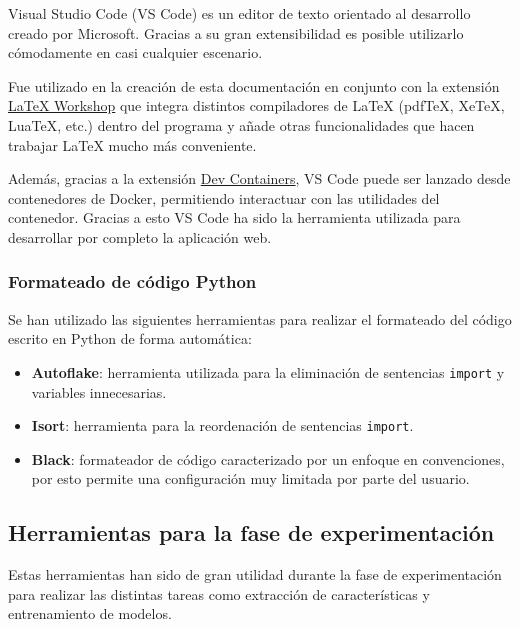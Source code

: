 Visual Studio Code (VS Code) es un editor de texto orientado al desarrollo
creado por Microsoft. Gracias a su gran extensibilidad es posible utilizarlo
cómodamente en casi cualquier escenario.

Fue utilizado en la creación de esta documentación en conjunto con la extensión
\href{https://github.com/James-Yu/LaTeX-Workshop}{\LaTeX{} Workshop} que integra
distintos compiladores de \LaTeX{} (pdfTeX, XeTeX, LuaTeX, etc.) dentro del
programa y añade otras funcionalidades que hacen trabajar \LaTeX{} mucho más
conveniente.

Además, gracias a la extensión
\href{https://marketplace.visualstudio.com/items?itemName=ms-vscode-remote.remote-containers}{Dev
Containers}, VS Code puede ser lanzado desde contenedores de Docker, permitiendo
interactuar con las utilidades del contenedor. Gracias a esto VS Code ha sido la
herramienta utilizada para desarrollar por completo la aplicación web.

\subsubsection{Formateado de código Python}

Se han utilizado las siguientes herramientas para realizar el formateado del
código escrito en Python de forma automática:

\begin{itemize}
      \item \textbf{Autoflake}: herramienta utilizada para la eliminación de
            sentencias \texttt{import} y variables innecesarias.
      \item \textbf{Isort}: herramienta para la reordenación de sentencias
            \texttt{import}.
      \item \textbf{Black}: formateador de código caracterizado por un enfoque
            en convenciones, por esto permite una configuración muy limitada por
            parte del usuario.
\end{itemize}

\subsection{Herramientas para la fase de experimentación}

Estas herramientas han sido de gran utilidad durante la fase de experimentación
para realizar las distintas tareas como extracción de características y
entrenamiento de modelos.

